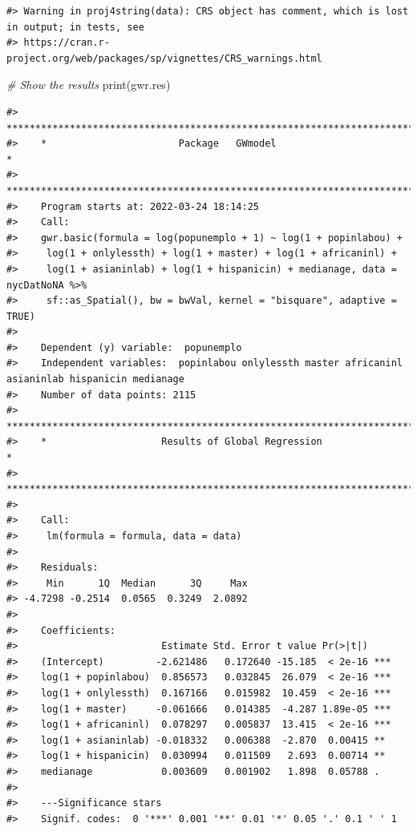 \documentclass[
  11pt,
]{book}
\newenvironment{Shaded}{\begin{snugshade}}{\end{snugshade}}
\newcommand{\CommentTok}[1]{\textcolor[rgb]{0.56,0.35,0.01}{\textit{#1}}}
\newcommand{\FunctionTok}[1]{\textcolor[rgb]{0.00,0.00,0.00}{#1}}
\newcommand{\NormalTok}[1]{#1}
\begin{document}
\begin{verbatim}
#> Warning in proj4string(data): CRS object has comment, which is lost in output; in tests, see
#> https://cran.r-project.org/web/packages/sp/vignettes/CRS_warnings.html
\end{verbatim}

\begin{Shaded}
\begin{Highlighting}[]
\CommentTok{\# Show the results}
\FunctionTok{print}\NormalTok{(gwr.res)}
\end{Highlighting}
\end{Shaded}

\begin{verbatim}
#>    ***********************************************************************
#>    *                       Package   GWmodel                             *
#>    ***********************************************************************
#>    Program starts at: 2022-03-24 18:14:25 
#>    Call:
#>    gwr.basic(formula = log(popunemplo + 1) ~ log(1 + popinlabou) + 
#>     log(1 + onlylessth) + log(1 + master) + log(1 + africaninl) + 
#>     log(1 + asianinlab) + log(1 + hispanicin) + medianage, data = nycDatNoNA %>% 
#>     sf::as_Spatial(), bw = bwVal, kernel = "bisquare", adaptive = TRUE)
#> 
#>    Dependent (y) variable:  popunemplo
#>    Independent variables:  popinlabou onlylessth master africaninl asianinlab hispanicin medianage
#>    Number of data points: 2115
#>    ***********************************************************************
#>    *                    Results of Global Regression                     *
#>    ***********************************************************************
#> 
#>    Call:
#>     lm(formula = formula, data = data)
#> 
#>    Residuals:
#>     Min      1Q  Median      3Q     Max 
#> -4.7298 -0.2514  0.0565  0.3249  2.0892 
#> 
#>    Coefficients:
#>                         Estimate Std. Error t value Pr(>|t|)    
#>    (Intercept)         -2.621486   0.172640 -15.185  < 2e-16 ***
#>    log(1 + popinlabou)  0.856573   0.032845  26.079  < 2e-16 ***
#>    log(1 + onlylessth)  0.167166   0.015982  10.459  < 2e-16 ***
#>    log(1 + master)     -0.061666   0.014385  -4.287 1.89e-05 ***
#>    log(1 + africaninl)  0.078297   0.005837  13.415  < 2e-16 ***
#>    log(1 + asianinlab) -0.018332   0.006388  -2.870  0.00415 ** 
#>    log(1 + hispanicin)  0.030994   0.011509   2.693  0.00714 ** 
#>    medianage            0.003609   0.001902   1.898  0.05788 .  
#> 
#>    ---Significance stars
#>    Signif. codes:  0 '***' 0.001 '**' 0.01 '*' 0.05 '.' 0.1 ' ' 1 

\end{verbatim}
\end{document}
